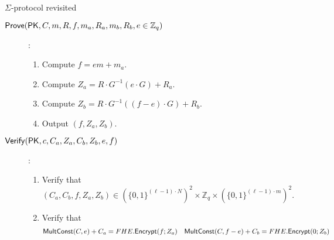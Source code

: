 \begin{subsection}{$\Sigma$-protocol revisited~\cite{DBLP:conf/pkc/ChaidosG15}}
\begin{description}
    \item[${\mathsf{Prove}}(\mathsf{PK}, C, m, R, f, m_a, R_a, m_b, R_b, e \in \mathbb{Z}_q)$]:
      \begin{enumerate}
      \item Compute $f = em +m_a$.
      \item Compute $Z_a = R \cdot G^{-1}(e \cdot G) + R_a$.
      \item Compute $Z_b = R \cdot G^{-1}((f-e) \cdot G) + R_b$.
      \item Output $(f, Z_a, Z_b)$.
      \end{enumerate}
      
    \item[${\mathsf{Verify}}(\mathsf{PK}, c, C_a, Z_a, C_b, Z_b, e, f)$]:
      \begin{enumerate}
      \item Verify that $(C_a, C_b, f, Z_a, Z_b) \in (\{0,1\}^{(\ell-1) \cdot N})^2 \times \mathbb{Z}_q \times (\{0,1\}^{(\ell-1)\cdot m})^2$.
      \item Verify that
        \begin{align*}
          {\mathsf{MultConst}}(C, e)+C_a &= FHE.{\mathsf{Encrypt}}(f; Z_a) & {\mathsf{MultConst}}(C, f-e) + C_b &= FHE.{\mathsf{Encrypt}}(0; Z_b)
        \end{align*}
      \end{enumerate}
    \end{description}
  \end{subsection}
 
